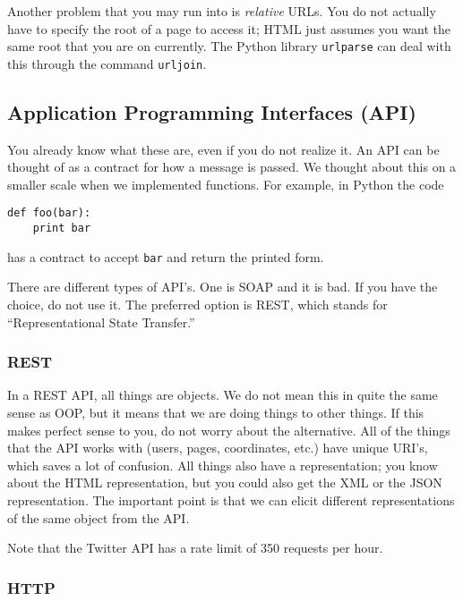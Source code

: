 \documentclass[12pt,letter]{article}
\begin{document}
Another problem that you may run into is \emph{relative} URLs. You do
not actually have to specify the root of a page to access it; HTML
just assumes you want the same root that you are on currently. The
Python library \texttt{urlparse} can deal with this through the
command \texttt{urljoin}. 

\subsection{Application Programming Interfaces (API)}

You already know what these are, even if you do not realize it. An API
can be thought of as a contract for how a message is passed. We
thought about this on a smaller scale when we implemented
functions. For example, in Python the code
\begin{verbatim}
def foo(bar):
    print bar
\end{verbatim}
has a contract to accept \texttt{bar} and return the printed form. 

There are different types of API's. One is SOAP and it is bad. If you
have the choice, do not use it. The preferred option is REST, which
stands for ``Representational State Transfer.''\footnotemark
{} 

\subsubsection{REST}

In a REST API, all things are objects. We do not mean this in quite
the same sense as OOP, but it means that we are doing things to other
things. If this makes perfect sense to you, do not worry about the
alternative. All of the things that the API works with (users, pages,
coordinates, etc.) have unique
URI's, which saves a lot of confusion. All things also have a
representation; you know about the HTML representation, but you could
also get the XML or the JSON representation. The important point is
that we can elicit different representations of the same object from
the API. 

Note that the Twitter API has a rate limit of 350 requests per hour. 

\subsubsection{HTTP}
\end{document}
